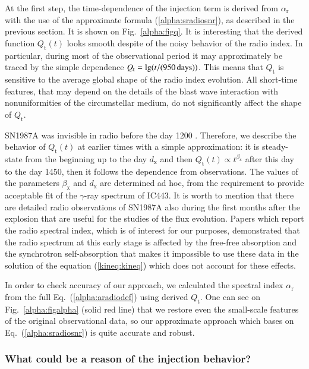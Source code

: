 \documentclass{aa}
\newcommand\un[1]{{\,\rm #1}}
\newcommand\rs[1]{_\mathrm{#1}}
\newcommand\g{$\gamma$}
\begin{document}
At the first step, the time-dependence of the injection term is derived from $\alpha\rs{r}$ with the use of the approximate formula (\ref{alpha:sradiosnr}), as described in the previous section. It is shown on Fig.~\ref{alpha:figq}. It is interesting that the derived function $Q\rs{t}(t)$ looks smooth despite of the noisy behavior of the radio index. In particular, during most of the observational period it may approximately be traced by the simple dependence $Q\rs{t}=\lg(t/(950\un{days}))$. This means that $Q\rs{t}$ is sensitive to the average global shape of the radio index evolution. All short-time features, that may depend on the details of the blast wave interaction with nonuniformities of the circumstellar medium, do not significantly affect the shape of $Q\rs{t}$.

SN1987A was invisible in radio before the day 1200 \citep{Zanardo-etal-2010}. Therefore, we describe the behavior of $Q\rs{t}(t)$ at earlier times with a simple approximation: it is steady-state from the beginning up to the day $d\rs{x}$ and then $Q\rs{t}(t)\propto t^{\beta\rs{x}}$ after this day to the day 1450, then it follows the dependence from observations. The values of the parameters $\beta\rs{x}$ and $d\rs{x}$ are determined ad hoc, from the requirement to provide acceptable fit of the \g-ray spectrum of IC443. It is worth to mention that there are detailed radio observations of SN1987A also during the first months after the explosion \citep[from February to September, e.g.][]{Ball-etal-2001} that are useful for the studies of the flux evolution. Papers which report the radio spectral index, which is of interest for our purposes, \citep{turtle-etal-1987,storey-manchester-1987} demonstrated that the radio spectrum at this early stage is affected by the free-free absorption and the synchrotron self-absorption that makes it impossible to use these data in the solution of the equation (\ref{kineq:kineq}) which does not account for these effects.

In order to check accuracy of our approach, we calculated the spectral index $\alpha\rs{r}$ from the full Eq.~(\ref{alpha:aradiodef}) using derived $Q\rs{t}$. One can see on Fig.~\ref{alpha:figalpha} (solid red line) that we restore even the small-scale features of the original observational data, so our approximate approach which bases on Eq.~(\ref{alpha:sradiosnr}) is quite accurate and robust. 


\subsubsection{What could be a reason of the injection behavior?}
\label{alpha:reason}
\end{document}
